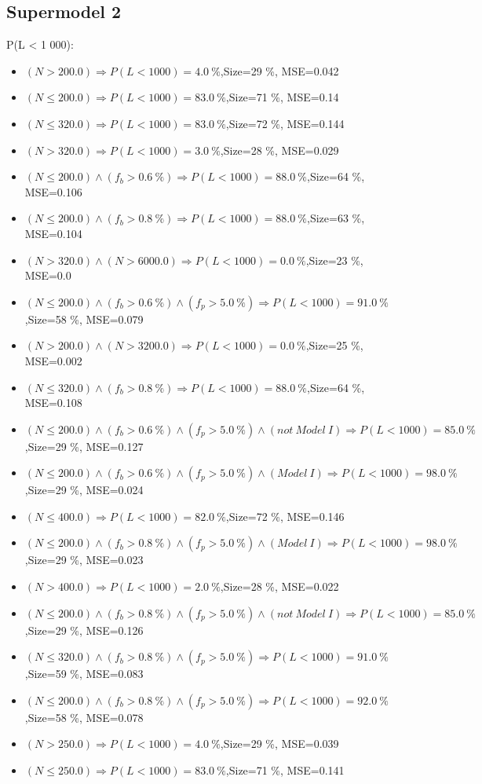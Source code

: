 \documentclass[numbered]{CSL}
\begin{document}
\subsection{Supermodel 2}
P(L < 1 000):
\begin{itemize}
\item $(N > 200.0) \Rightarrow P(L < 1 000) = 4.0~\%$,\hfill Size=29 \%, MSE=0.042
\item $(N \leq 200.0) \Rightarrow P(L < 1 000) = 83.0~\%$,\hfill Size=71 \%, MSE=0.14
\item $(N \leq 320.0) \Rightarrow P(L < 1 000) = 83.0~\%$,\hfill Size=72 \%, MSE=0.144
\item $(N > 320.0) \Rightarrow P(L < 1 000) = 3.0~\%$,\hfill Size=28 \%, MSE=0.029
\item $(N \leq 200.0) \land (f_b > 0.6~\%) \Rightarrow P(L < 1 000) = 88.0~\%$,\hfill Size=64 \%, MSE=0.106
\item $(N \leq 200.0) \land (f_b > 0.8~\%) \Rightarrow P(L < 1 000) = 88.0~\%$,\hfill Size=63 \%, MSE=0.104
\item $(N > 320.0) \land (N > 6000.0) \Rightarrow P(L < 1 000) = 0.0~\%$,\hfill Size=23 \%, MSE=0.0
\item $(N \leq 200.0) \land (f_b > 0.6~\%) \land (f_p > 5.0~\%) \Rightarrow P(L < 1 000) = 91.0~\%$,\hfill Size=58 \%, MSE=0.079
\item $(N > 200.0) \land (N > 3200.0) \Rightarrow P(L < 1 000) = 0.0~\%$,\hfill Size=25 \%, MSE=0.002
\item $(N \leq 320.0) \land (f_b > 0.8~\%) \Rightarrow P(L < 1 000) = 88.0~\%$,\hfill Size=64 \%, MSE=0.108
\item $(N \leq 200.0) \land (f_b > 0.6~\%) \land (f_p > 5.0~\%) \land (not~Model~I) \Rightarrow P(L < 1 000) = 85.0~\%$,\hfill Size=29 \%, MSE=0.127
\item $(N \leq 200.0) \land (f_b > 0.6~\%) \land (f_p > 5.0~\%) \land (Model~I) \Rightarrow P(L < 1 000) = 98.0~\%$,\hfill Size=29 \%, MSE=0.024
\item $(N \leq 400.0) \Rightarrow P(L < 1 000) = 82.0~\%$,\hfill Size=72 \%, MSE=0.146
\item $(N \leq 200.0) \land (f_b > 0.8~\%) \land (f_p > 5.0~\%) \land (Model~I) \Rightarrow P(L < 1 000) = 98.0~\%$,\hfill Size=29 \%, MSE=0.023
\item $(N > 400.0) \Rightarrow P(L < 1 000) = 2.0~\%$,\hfill Size=28 \%, MSE=0.022
\item $(N \leq 200.0) \land (f_b > 0.8~\%) \land (f_p > 5.0~\%) \land (not~Model~I) \Rightarrow P(L < 1 000) = 85.0~\%$,\hfill Size=29 \%, MSE=0.126
\item $(N \leq 320.0) \land (f_b > 0.8~\%) \land (f_p > 5.0~\%) \Rightarrow P(L < 1 000) = 91.0~\%$,\hfill Size=59 \%, MSE=0.083
\item $(N \leq 200.0) \land (f_b > 0.8~\%) \land (f_p > 5.0~\%) \Rightarrow P(L < 1 000) = 92.0~\%$,\hfill Size=58 \%, MSE=0.078
\item $(N > 250.0) \Rightarrow P(L < 1 000) = 4.0~\%$,\hfill Size=29 \%, MSE=0.039
\item $(N \leq 250.0) \Rightarrow P(L < 1 000) = 83.0~\%$,\hfill Size=71 \%, MSE=0.141
\end{itemize}
\end{document}
